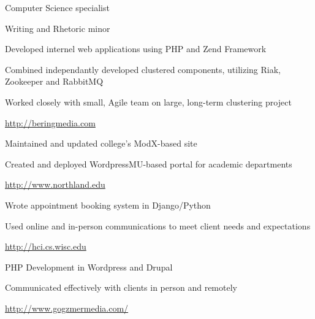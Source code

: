 \documentclass[letterpaper,11pt,notitlepage]{article}
\begin{document}

\vbar
{}
    \begin{employment}
        \item Computer Science specialist
        \item Writing and Rhetoric minor
    \end{employment}
\vbar
{}
        \begin{employment}
            \item Developed internel web applications using PHP and Zend 
            Framework
            \item Combined independantly developed clustered components, 
            utilizing Riak, Zookeeper and RabbitMQ 
            \item Worked closely with small, Agile team on large, long-term 
            clustering project 
            \item \url{http://beringmedia.com}
        \end{employment}
        \begin{employment}
            \item Maintained and updated college's ModX-based site
            \item Created and deployed WordpressMU-based portal for academic
            departments 
            \item \url{http://www.northland.edu}
        \end{employment}
        \begin{employment}
            \item Wrote appointment booking system in Django/Python 
            \item Used online and in-person communications to meet client needs
            and expectations
            \item \url{http://hci.cs.wisc.edu}
        \end{employment}
        \begin{employment}
            \item PHP Development in Wordpress and Drupal
            \item Communicated effectively with clients in person and remotely
            \item \url{http://www.gogzmermedia.com/}
        \end{employment}
\end{document}
